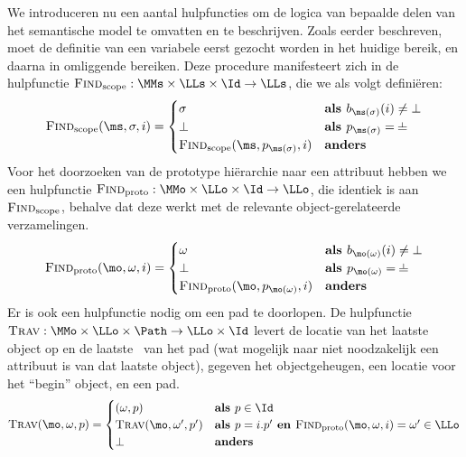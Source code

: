 We introduceren nu een aantal hulpfuncties om de logica van bepaalde delen van het semantische model te omvatten en te beschrijven.
Zoals eerder beschreven, moet de definitie van een variabele eerst gezocht worden in het huidige bereik, en daarna in omliggende bereiken. Deze procedure manifesteert zich in de hulpfunctie $\textsc{Find}_\text{scope} : \MMs \times \LLs \times \Id \to \LLs$, die we als volgt definiëren:
%
\begin{equation*}
  \textsc{Find}_\text{scope}(\ms, \sigma, i) = \begin{cases}
    \sigma & \textbf{als } b_{\ms(\sigma)}(i) \neq \bot \\
    \bot & \textbf{als } p_{\ms(\sigma)} = \nil \\
    \textsc{Find}_\text{scope}(\ms, p_{\ms(\sigma)}, i) & \textbf{anders}
  \end{cases}
\end{equation*}
%
Voor het doorzoeken van de prototype hiërarchie naar een attribuut hebben we een hulpfunctie $\textsc{Find}_\text{proto} : \MMo \times \LLo \times \Id \to \LLo$, die identiek is aan $\textsc{Find}_\text{scope}$, behalve dat deze werkt met de relevante object-gerelateerde verzamelingen.
%
\begin{equation*}
  \textsc{Find}_\text{proto}(\mo, \omega, i) = \begin{cases}
    \omega & \textbf{als } b_{\mo(\omega)}(i) \neq \bot \\
    \bot & \textbf{als } p_{\mo(\omega)} = \nil \\
    \textsc{Find}_\text{proto}(\mo, p_{\mo(\omega)}, i) & \textbf{anders}
  \end{cases}
\end{equation*}
%
Er is ook een hulpfunctie nodig om een pad te doorlopen. De hulpfunctie $\textsc{Trav} : \MMo \times \LLo \times \Path \to \LLo \times \Id$ levert de locatie van het laatste object op en de laatste \Id\ van het pad (wat mogelijk naar niet noodzakelijk een attribuut is van dat laatste object), gegeven het objectgeheugen, een locatie voor het ``begin'' object, en een pad.
%
\begin{equation*}
  \textsc{Trav}(\mo, \omega, p) = \begin{cases}
    (\omega, p) & \textbf{als } p \in \Id \\
    \textsc{Trav}(\mo, \omega', p') & \textbf{als } p = i.p' \textbf{ en } \textsc{Find}_\text{proto}(\mo, \omega, i) = \omega' \in \LLo \\
    \bot & \textbf{anders}
  \end{cases}
\end{equation*}
%


